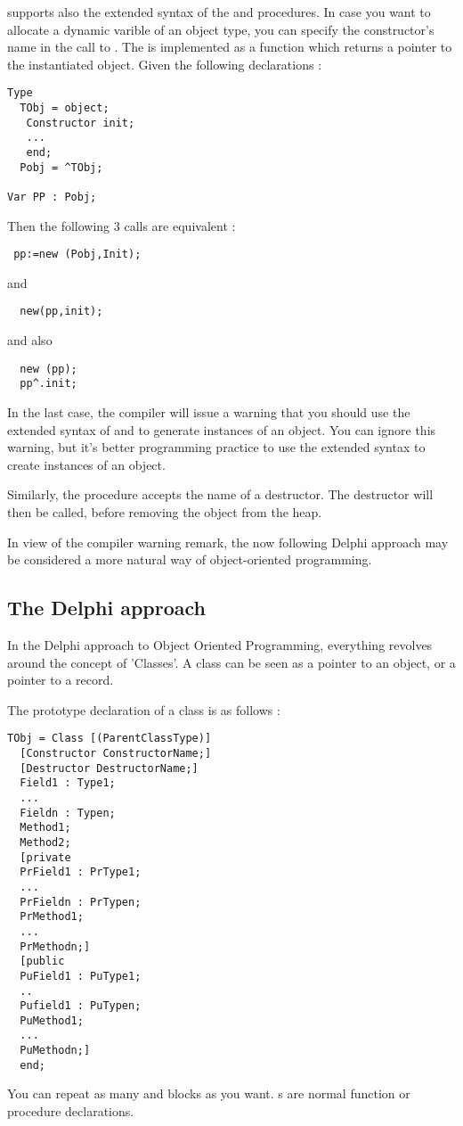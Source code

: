 \documentclass{report}
\begin{document}
\fpc supports also the extended syntax of the  and 
procedures. In case you want to allocate a dynamic varible of an object
type, you can specify the constructor's name in the call to .
The  is implemented as a function which returns a pointer to the
instantiated object. Given the following declarations :
\begin{verbatim}
Type
  TObj = object;
   Constructor init;
   ...
   end;
  Pobj = ^TObj;

Var PP : Pobj;
\end{verbatim}  
Then the following 3 calls are equivalent :
\begin{verbatim}
 pp:=new (Pobj,Init);
\end{verbatim}
and
\begin{verbatim}
  new(pp,init);
\end{verbatim}
and also
\begin{verbatim}
  new (pp);
  pp^.init;
\end{verbatim}
In the last case, the compiler will issue a warning that you should use the
extended syntax of  and  to generate instances of an
object. You can ignore this warning, but it's better programming practice to
use the extended syntax to create instances of an object.

Similarly, the  procedure accepts the name of a destructor. The
destructor will then be called, before removing the object from the heap.

In view of the compiler warning remark, the now following Delphi approach may 
be considered a more natural way of object-oriented programming.

\subsection{The Delphi approach}
In the Delphi approach to Object Oriented Programming, everything revolves
around  the concept of 'Classes'. 
A class can be seen as a pointer to an object, or a pointer to a record. 

The prototype declaration of a class is as follows :
\begin{verbatim}
TObj = Class [(ParentClassType)]
  [Constructor ConstructorName;]
  [Destructor DestructorName;]
  Field1 : Type1;
  ...
  Fieldn : Typen;
  Method1;
  Method2;
  [private
  PrField1 : PrType1;
  ...
  PrFieldn : PrTypen;
  PrMethod1;
  ...
  PrMethodn;]
  [public
  PuField1 : PuType1;
  ..
  Pufield1 : PuTypen;
  PuMethod1;
  ...
  PuMethodn;]
  end;
\end{verbatim}
You can repeat as many  and  blocks as you want.
s are normal function or procedure declarations. 
\end{document}
